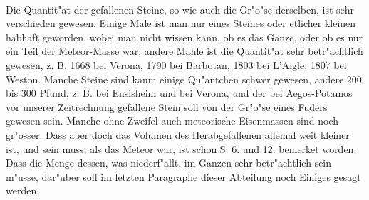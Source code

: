 \documentclass[a4paper, 11pt, oneside, polutonikogreek, german]{article}
\begin{document}
\paragraph{}
Die Quantit"at der gefallenen Steine, so wie auch die Gr"o"se derselben, ist sehr verschieden gewesen. Einige Male ist man nur eines Steines oder etlicher kleinen habhaft geworden, wobei man nicht wissen kann, ob es das Ganze, oder ob es nur ein Teil der Meteor-Masse war; andere Mahle ist die Quantit"at sehr betr"achtlich gewesen, z. B. 1668 bei Verona, 1790 bei Barbotan, 1803 bei L'Aigle, 1807 bei Weston. Manche Steine sind kaum einige Qu"antchen schwer gewesen, andere 200 bis 300 Pfund, z. B. bei Ensisheim und bei Verona, und der bei Aegos-Potamos vor unserer Zeitrechnung gefallene Stein soll von der Gr"o"se eines Fuders gewesen sein. Manche ohne Zweifel auch meteorische Eisenmassen sind noch gr"osser. Dass aber doch das Volumen des Herabgefallenen allemal weit kleiner ist, und sein muss, als das Meteor war, ist schon S. 6. und 12. bemerket worden. Dass die Menge dessen, was niederf"allt, im Ganzen sehr betr"achtlich sein m"usse, dar"uber soll im letzten Paragraphe dieser Abteilung noch Einiges gesagt werden.
\subsection{}
\end{document}
